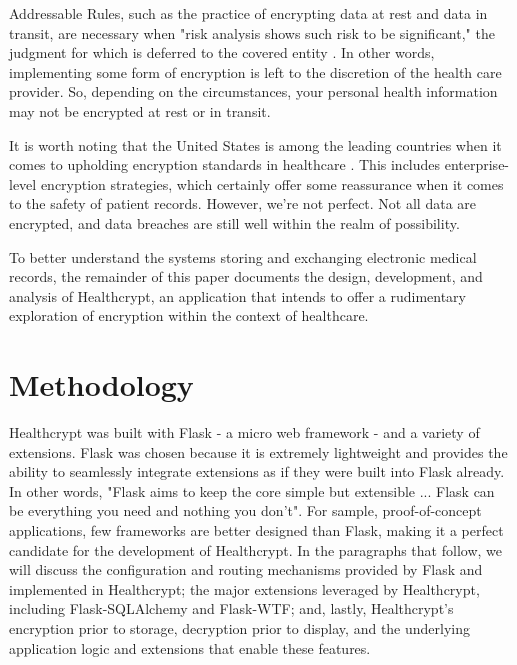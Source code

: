 \documentclass[letterpaper, 10pt,DIV=13]{scrartcl}
\begin{document}
\begin{multicols}{2}
\begin{spacing}{1.25}
Addressable Rules, such as the practice of encrypting data at rest and data in transit, are necessary when "risk analysis shows such risk to be significant," the judgment for which is deferred to the covered entity \cite{hippaprof2017}. In other words, implementing some form of encryption is left to the discretion of the health care provider. So, depending on the circumstances, your personal health information may not be encrypted at rest or in transit.

It is worth noting that the United States is among the leading countries when it comes to upholding encryption standards in healthcare \cite{ponemon2020}. This includes enterprise-level encryption strategies, which certainly offer some reassurance when it comes to the safety of patient records. However, we're not perfect. Not all data are encrypted, and data breaches are still well within the realm of possibility.

To better understand the systems storing and exchanging electronic medical records, the remainder of this paper documents the design, development, and analysis of Healthcrypt, an application that intends to offer a rudimentary exploration of encryption within the context of healthcare.
\end{spacing}

\vspace{-2.5pt}

\section*{Methodology}
\begin{spacing}{1.25}

Healthcrypt was built with Flask - a micro web framework - and a variety of extensions. Flask was chosen because it is extremely lightweight and provides the ability to seamlessly integrate extensions as if they were built into Flask already. In other words, "Flask aims to keep the core simple but extensible ... Flask can be everything you need and nothing you don’t"\cite{FlaskDocs}. For sample, proof-of-concept applications, few frameworks are better designed than Flask, making it a perfect candidate for the development of Healthcrypt. In the paragraphs that follow, we will discuss the configuration and routing mechanisms provided by Flask and implemented in Healthcrypt; the major extensions leveraged by Healthcrypt, including Flask-SQLAlchemy and Flask-WTF; and, lastly, Healthcrypt's encryption prior to storage, decryption prior to display, and the underlying application logic and extensions that enable these features.


\end{spacing}
\end{multicols}
\end{document}
